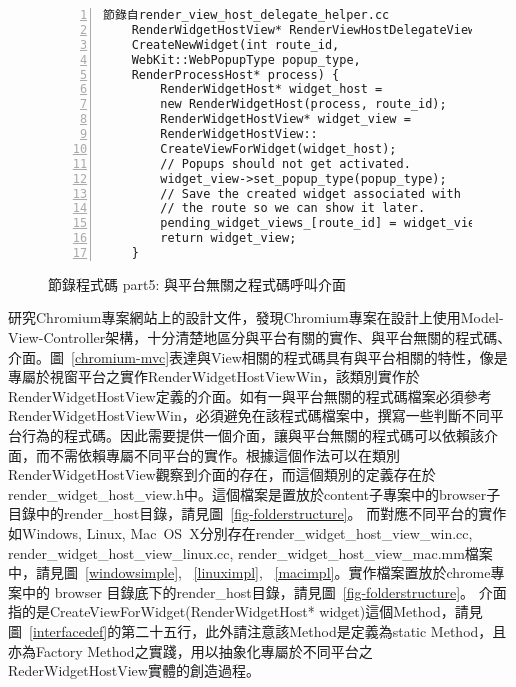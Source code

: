 \begin{figure}
\linespread{0.8}
\begin{Verbatim}[numbers=left,framesep=1mm,numbersep=-12pt]
	節錄自render_view_host_delegate_helper.cc
	RenderWidgetHostView* RenderViewHostDelegateViewHelper::
	CreateNewWidget(int route_id, 
	WebKit::WebPopupType popup_type, 
	RenderProcessHost* process) {
		RenderWidgetHost* widget_host =
		new RenderWidgetHost(process, route_id);
		RenderWidgetHostView* widget_view =
		RenderWidgetHostView::
		CreateViewForWidget(widget_host);
		// Popups should not get activated.
		widget_view->set_popup_type(popup_type);
		// Save the created widget associated with
		// the route so we can show it later.
		pending_widget_views_[route_id] = widget_view;
		return widget_view;
	}
\end{Verbatim}
\caption{節錄程式碼 part5: 與平台無關之程式碼呼叫介面}
\label{crossplatformcall}
\end{figure}

研究Chro\-mium專案網站上的設計文件\cite{chromiummvc}，發現Chro\-mium專案在設計上使用Model-View-Controller架構\cite{modelviewcontroller}，十分清楚地區分與平台有關的實作、與平台無關的程式碼、介面。圖~\ref{chromium-mvc}表達與View相關的程式碼具有與平台相關的特性，像是專屬於視窗平台之實作Render\-Widget\-Host\-View\-Win，該類別實作於Render\-Widget\-Host\-View定義的介面。如有一與平台無關的程式碼檔案必須參考Render\-Widget\-Host\-View\-Win，必須避免在該程式碼檔案中，撰寫一些判斷不同平台行為的程式碼。因此需要提供一個介面，讓與平台無關的程式碼可以依賴該介面，而不需依賴專屬不同平台的實作。根據這個作法可以在類別Render\-Widget\-Host\-View觀察到介面的存在，而這個類別的定義存在於render\_widget\_host\_view.h中。這個檔案是置放於content子專案中的browser子目錄中的render\_host目錄，請見圖~\ref{fig-folderstructure}。
而對應不同平台的實作如Windows, Linux, Mac\-\ OS\-\ X分別存在render\_\-widget\_\-host\_\-view\_\-win.cc, render\_\-widget\_\-host\_\-view\_\-linux.cc, render\_\-widget\_\-host\_\-view\_\-mac.mm檔案中，請見圖~\ref{windowsimple}, ~\ref{linuximpl}, ~\ref{macimpl}。實作檔案置放於chrome專案中的 browser 目錄底下的render\_host目錄，請見圖~\ref{fig-folderstructure}。
介面指的是Create\-View\-For\-Widget\-(Render\-Widget\-Host* widget)這個Method，請見圖~\ref{interfacedef}的第二十五行，此外請注意該Method是定義為static Method，且亦為Factory Method之實踐\cite{gofdesignpattern}，用以抽象化專屬於不同平台之RederWidgetHostView實體的創造過程。

